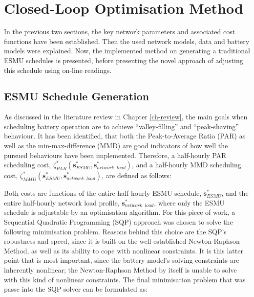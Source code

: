 \section{Closed-Loop Optimisation Method}
\label{ch1:sec:closed-loop-optimisation-method}

In the previous two sections, the key network parameters and associated cost functions have been established.
Then the used network models, data and battery models were explained.
Now, the implemented method on generating a traditional ESMU schedules is presented, before presenting the novel approach of adjusting this schedule using on-line readings.

\subsection{ESMU Schedule Generation}
\label{ch1:subsec:esmu-schedule-generation}

As discussed in the literature review in Chapter \ref{ch-review}, the main goals when scheduling battery operation are to achieve ``valley-filling'' and ``peak-shaving'' behaviour.
It has been identified, that both the Peak-to-Average Ratio (PAR) as well as the min-max-difference (MMD) are good indicators of how well the pursued behaviours have been implemented.
Therefore, a half-hourly PAR scheduling cost, $\zeta^*_{PAR}(\textbf{s}^*_{ESMU}, \textbf{s}^*_{network\;\;load})$, and a half-hourly MMD scheduling cost, $\zeta^*_{MMD}(\textbf{s}^*_{ESMU}, \textbf{s}^*_{network\;\;load})$, are defined as follows:





Both costs are functions of the entire half-hourly ESMU schedule, $\textbf{s}^*_{ESMU}$, and the entire half-hourly network load profile, $\textbf{s}^*_{network\;\;load}$, where only the ESMU schedule is adjustable by an optimisation algorithm.
For this piece of work, a Sequential Quadratic Programming (SQP) approach was chosen to solve the following minimisation problem.
Reasons behind this choice are the SQP's robustness and speed, since it is built on the well established Newton-Raphson Method, as well as its ability to cope with nonlinear constraints.
It is this latter point that is most important, since the battery model's solving constraints are inherently nonlinear; the Newton-Raphson Method by itself is unable to solve with this kind of nonlinear constraints.
The final minimisation problem that was passe into the SQP solver can be formulated as:

